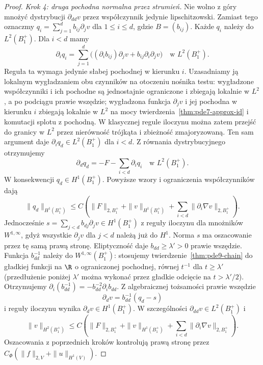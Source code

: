 \begin{proof}
\emph{Krok 4: druga pochodna normalna przez strumień.}
Nie wolno z góry mnożyć dystrybucji $\partial_{dd}v$
przez współczynnik jedynie lipschitzowski.
Zamiast tego oznaczmy $q_i=\sum_{j=1}^d b_{ij}\partial_jv$
dla $1\le i\le d$, gdzie $B=(b_{ij})$.
Każde $q_i$ należy do $L^2(B_1^+)$.
Dla $i<d$ mamy
\[
 \partial_i q_i=\sum_{j=1}^d
 \bigl((\partial_i b_{ij})\partial_jv+
             b_{ij}\partial_i\partial_jv\bigr)
 \quad\text{w }L^2(B_1^+).
\]
Reguła ta wymaga jedynie słabej pochodnej w kierunku $i$.
Uzasadniamy ją lokalnym wygładzaniem obu czynników
na otoczeniu nośnika testu: wygładzone współczynniki
i ich pochodne są jednostajnie ograniczone i zbiegają
lokalnie w $L^2$, a po podciągu prawie wszędzie;
wygładzona funkcja $\partial_jv$ i jej pochodna
w kierunku $i$ zbiegają lokalnie w $L^2$
na mocy twierdzenia~\ref{thm:pde7-approx-id}
i komutacji splotu z pochodną.
W klasycznej regule iloczynu można zatem przejść
do granicy w $L^2$ przez nierówność trójkąta
i zbieżność zmajoryzowaną.
Ten sam argument daje $\partial_i q_d\in L^2(B_1^+)$
dla $i<d$. Z równania dystrybucyjnego otrzymujemy
\[
 \partial_d q_d=-F-\sum_{i<d}\partial_i q_i
 \quad\text{w }L^2(B_1^+).
\]
W konsekwencji $q_d\in H^1(B_1^+)$.
Powyższe wzory i ograniczenia współczynników dają
\[
 \|q_d\|_{H^1(B_1^+)}
 \le C\left(\|F\|_{2,B_1^+}+\|v\|_{H^1(B_1^+)}
              +\sum_{i<d}\|\partial_i\nabla v\|_{2,B_1^+}\right).
\]
Jednocześnie $s=\sum_{j<d}b_{dj}\partial_jv\in H^1(B_1^+)$
z reguły iloczynu dla mnożników $W^{1,\infty}$,
gdyż wszystkie $\partial_jv$ dla $j<d$ należą już do $H^1$.
Norma $s$ ma oszacowanie przez tę samą prawą stronę.
Eliptyczność daje $b_{dd}\ge\lambda'>0$ prawie wszędzie.
Funkcja $b_{dd}^{-1}$ należy do $W^{1,\infty}(B_1^+)$:
stosujemy twierdzenie~\ref{thm:pde9-chain} do gładkiej
funkcji na $\R$ o ograniczonej pochodnej, równej $t^{-1}$
dla $t\ge\lambda'$ (przedłużenie poniżej $\lambda'$
można wykonać przez gładkie odcięcie na $t>\lambda'/2$).
Otrzymujemy
$\partial_i(b_{dd}^{-1})=-b_{dd}^{-2}\partial_i b_{dd}$.
Z algebraicznej tożsamości prawie wszędzie
\[
 \partial_dv=b_{dd}^{-1}(q_d-s)
\]
i reguły iloczynu wynika $\partial_dv\in H^1(B_1^+)$.
W szczególności $\partial_{dd}v\in L^2(B_1^+)$ i
\[
 \|v\|_{H^2(B_1^+)}
 \le C\left(\|F\|_{2,B_1^+}+\|v\|_{H^1(B_1^+)}
              +\sum_{i<d}\|\partial_i\nabla v\|_{2,B_1^+}\right).
\]
Oszacowania z poprzednich kroków kontrolują prawą stronę
przez $C_\Phi(\|f\|_{2,V}+\|u\|_{H^1(V)})$.


\end{proof}
